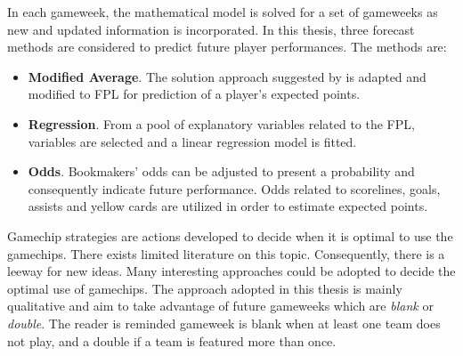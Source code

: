 \newpar

In each gameweek, the mathematical model is solved for a set of gameweeks as new and updated information is incorporated. In this thesis, three forecast methods are considered to predict future player performances. The methods are: 
\begin{itemize}
    \item \textbf{Modified Average}. The solution approach suggested by \cite{Bonomo} is adapted and modified to FPL for prediction of a player's expected points.
    \item \textbf{Regression}. From a pool of explanatory variables related to the FPL, variables are selected and a linear regression model is fitted. 
    \item \textbf{Odds}. Bookmakers' odds can be adjusted to present a probability and consequently indicate future performance. Odds related to scorelines, goals, assists and yellow cards are utilized in order to estimate expected points. 
\end{itemize}

\newpar

Gamechip strategies are actions developed to decide when it is optimal to use the gamechips.  There exists limited literature on this topic. Consequently, there is a leeway for new ideas. Many interesting approaches could be adopted to decide the optimal use of gamechips. The approach adopted in this thesis is mainly qualitative and aim to take advantage of future gameweeks which are \textit{blank} or \textit{double}. The reader is reminded gameweek is blank when at least one team does not play, and a double if a team is featured more than once. 

